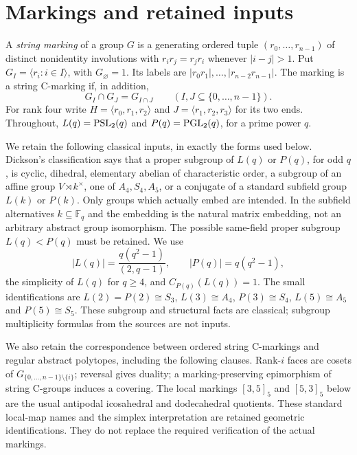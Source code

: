 \section{Markings and retained inputs}
A \emph{string marking} of a group $G$ is a generating ordered tuple
$(r_0,\ldots,r_{n-1})$ of distinct nonidentity involutions with
$r_ir_j=r_jr_i$ whenever $|i-j|>1$. Put
$G_I=\langle r_i:i\in I\rangle$, with $G_\varnothing=1$.
Its labels are $|r_0r_1|,\ldots,|r_{n-2}r_{n-1}|$.
The marking is a string C-marking if, in addition,
\begin{equation}\label{eq:ip}
 G_I\cap G_J=G_{I\cap J}\qquad(I,J\subseteq\{0,\ldots,n-1\}).
\end{equation}
For rank four write $H=\langle r_0,r_1,r_2\rangle$ and
$J=\langle r_1,r_2,r_3\rangle$ for its two ends. Throughout,
$L(q)=\operatorname{PSL}_2(q)$ and $P(q)=\operatorname{PGL}_2(q)$, for a prime power $q$.

We retain the following classical inputs, in exactly the forms used below.
Dickson's classification says that a proper subgroup of $L(q)$ or $P(q)$,
for odd $q$, is cyclic, dihedral, elementary abelian of characteristic order,
a subgroup of an affine group $V\rtimes k^\times$, one of $A_4,S_4,A_5$,
or a conjugate of a standard subfield group $L(k)$ or $P(k)$.
Only groups which actually embed are intended. In the subfield alternatives
$k\subseteq\mathbb F_q$ and the embedding is the natural matrix embedding,
not an arbitrary abstract group isomorphism. The possible same-field proper
subgroup $L(q)<P(q)$ must be retained. We use
\[
 |L(q)|=\frac{q(q^2-1)}{(2,q-1)},\qquad |P(q)|=q(q^2-1),
\]
the simplicity of $L(q)$ for $q\ge4$, and $C_{P(q)}(L(q))=1$.
The small identifications are $L(2)=P(2)\cong S_3$, $L(3)\cong A_4$,
$P(3)\cong S_4$, $L(5)\cong A_5$ and $P(5)\cong S_5$.
These subgroup and structural facts are classical; subgroup multiplicity
formulas from the sources are not inputs.

We also retain the correspondence between ordered string C-markings and
regular abstract polytopes, including the following clauses. Rank-$i$ faces
are cosets of $G_{\{0,\ldots,n-1\}\setminus\{i\}}$; reversal gives duality;
a marking-preserving epimorphism of string C-groups induces a covering.
The local markings $[3,5]_5$ and $[5,3]_5$ below are the usual antipodal
icosahedral and dodecahedral quotients. These standard local-map names and
the simplex interpretation are retained geometric identifications.
They do not replace the required verification of the actual markings.

